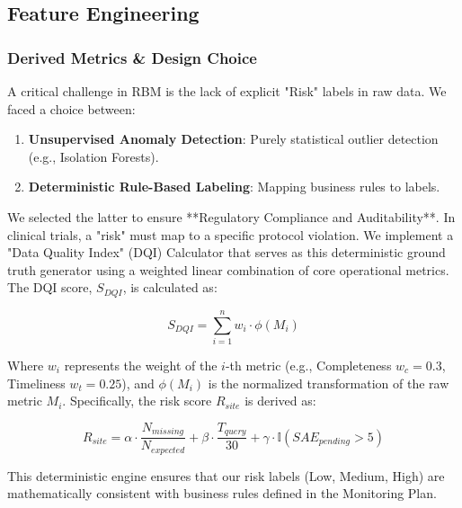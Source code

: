 \documentclass[conference]{IEEEtran}
\begin{document}
\subsection{\textbf{Feature Engineering}}
\subsubsection{\textbf{Derived Metrics \& Design Choice}}
A critical challenge in RBM is the lack of explicit "Risk" labels in raw data. We faced a choice between:
\begin{enumerate}
    \item \textbf{Unsupervised Anomaly Detection}: Purely statistical outlier detection (e.g., Isolation Forests).
    \item \textbf{Deterministic Rule-Based Labeling}: Mapping business rules to labels.
\end{enumerate}
We selected the latter to ensure **Regulatory Compliance and Auditability**. In clinical trials, a "risk" must map to a specific protocol violation. We implement a "Data Quality Index" (DQI) Calculator that serves as this deterministic ground truth generator using a weighted linear combination of core operational metrics. 
The DQI score, $S_{DQI}$, is calculated as:

\begin{equation}
    S_{DQI} = \sum_{i=1}^{n} w_i \cdot \phi(M_i)
\end{equation}

Where $w_i$ represents the weight of the $i$-th metric (e.g., Completeness $w_c=0.3$, Timeliness $w_t=0.25$), and $\phi(M_i)$ is the normalized transformation of the raw metric $M_i$. 
Specifically, the risk score $R_{site}$ is derived as:

\begin{equation}
    R_{site} = \alpha \cdot \frac{N_{missing}}{N_{expected}} + \beta \cdot \frac{T_{query}}{30} + \gamma \cdot \mathbb{I}(SAE_{pending} > 5)
\end{equation}

This deterministic engine ensures that our risk labels (Low, Medium, High) are mathematically consistent with business rules defined in the Monitoring Plan.
\end{document}
